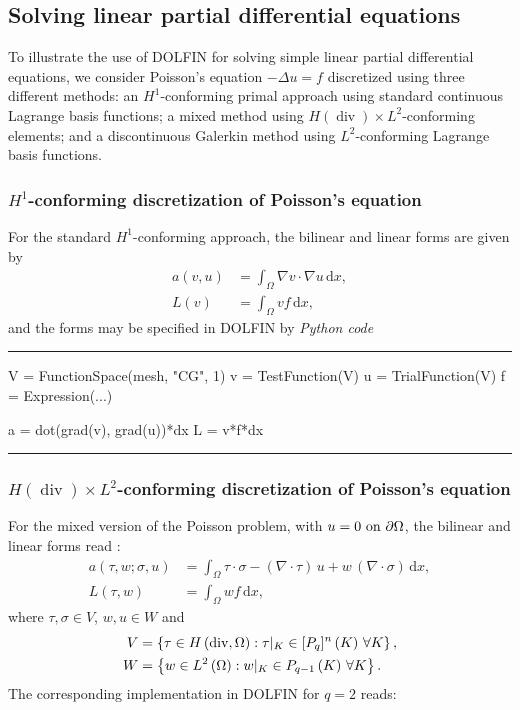 \documentclass[acmtoms]{acmtrans2m}
\newenvironment{pythoncode}[1]{\center\minipage{#1\textwidth}\footnotesize\hfill\it Python code \rm\vspace{0.1cm}\hrule\renewcommand{\baselinestretch}{0.9}\footnotesize\verbatim}{\endverbatim\hrule\normalsize\endminipage\newline\endcenter}
\newcommand{\brac}[1]{\left( {#1} \right)}
\newcommand{\bracc}[1]{\left\{ {#1} \right\}}
\newcommand{\dx}{\,\mathrm{d}x}
\newcommand{\dolfin}{DOLFIN}
\DeclareMathOperator{\Div}{div}
\begin{document}
\subsection{Solving linear partial differential equations}

To illustrate the use of \dolfin{} for solving simple linear partial
differential equations, we consider Poisson's equation $-\Delta u =f$
discretized using three different methods: an $H^{1}$-conforming
primal approach using standard continuous Lagrange basis functions; a
mixed method using $H(\Div)\times L^2$-conforming elements; and a
discontinuous Galerkin method using $L^{2}$-conforming
Lagrange basis functions.

\subsubsection{$H^{1}$-conforming discretization of Poisson's equation}

For the standard $H^1$-conforming approach, the bilinear and
linear forms are given by
\begin{align}
  a(v, u) &= \int_{\Omega} \nabla v \cdot \nabla u \dx, \\
  L(v)    &= \int_{\Omega} v f \dx,
\end{align}
and the forms may be specified in \dolfin{} by
\begin{pythoncode}{0.9}
V = FunctionSpace(mesh, "CG", 1)
v = TestFunction(V)
u = TrialFunction(V)
f = Expression(...)

a = dot(grad(v), grad(u))*dx
L = v*f*dx
\end{pythoncode}

\subsubsection{$H(\Div) \times L^2$-conforming discretization of Poisson's equation}

For the mixed version of the Poisson problem, with $u = 0 \ {\rm on} \
\partial\Omega$, the bilinear and linear forms read
\cite{brezzi:book}:
\begin{align}
  a(\tau, w; \sigma, u) &= \int_{\Omega} \tau \cdot \sigma
  - (\nabla \cdot \tau) \, u
  + w \, (\nabla \cdot \sigma) \dx, \\
  L(\tau, w) &= \int_{\Omega} w f \dx,
\end{align}
where $\tau, \sigma \in V$, $w, u \in W$ and
\begin{align}
  V &= \bracc{\tau \in H\brac{{\rm div}, \Omega}:
    \tau\vert_{K} \in [P_q]^n \brac{K} \, \forall K},
  \\
  W &= \bracc{w \in L^{2}\brac{\Omega}:
    w\vert_{K} \in P_{q-1}\brac{K} \, \forall K}.
\end{align}
The corresponding implementation in \dolfin{} for $q = 2$ reads:
\end{document}

